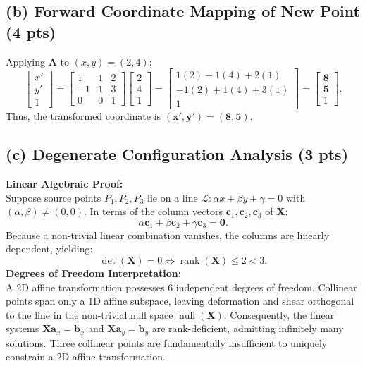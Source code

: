 \documentclass[11pt,a4paper]{article}
\begin{document}
\subsection{(b) Forward Coordinate Mapping of New Point (4 pts)}
Applying $\mathbf{A}$ to $(x, y) = (2, 4)$:
\begin{equation}
\begin{bmatrix} x' \\ y' \\ 1 \end{bmatrix} = \begin{bmatrix} 1 & 1 & 2 \\ -1 & 1 & 3 \\ 0 & 0 & 1 \end{bmatrix} \begin{bmatrix} 2 \\ 4 \\ 1 \end{bmatrix} = \begin{bmatrix} 1(2) + 1(4) + 2(1) \\ -1(2) + 1(4) + 3(1) \\ 1 \end{bmatrix} = \begin{bmatrix} \mathbf{8} \\ \mathbf{5} \\ 1 \end{bmatrix}.
\end{equation}
Thus, the transformed coordinate is $\mathbf{(x', y') = (8, 5)}$.

\subsection{(c) Degenerate Configuration Analysis (3 pts)}
\noindent\textbf{Linear Algebraic Proof:}\\
Suppose source points $P_1, P_2, P_3$ lie on a line $\mathcal{L}: \alpha x + \beta y + \gamma = 0$ with $(\alpha, \beta) \neq (0, 0)$. In terms of the column vectors $\mathbf{c}_1, \mathbf{c}_2, \mathbf{c}_3$ of $\mathbf{X}$:
\begin{equation}
\alpha \mathbf{c}_1 + \beta \mathbf{c}_2 + \gamma \mathbf{c}_3 = \mathbf{0}.
\end{equation}
Because a non-trivial linear combination vanishes, the columns are linearly dependent, yielding:
\begin{equation}
\det(\mathbf{X}) = 0 \iff \operatorname{rank}(\mathbf{X}) \le 2 < 3.
\end{equation}
\noindent\textbf{Degrees of Freedom Interpretation:}\\
A 2D affine transformation possesses 6 independent degrees of freedom. Collinear points span only a 1D affine subspace, leaving deformation and shear orthogonal to the line in the non-trivial null space $\operatorname{null}(\mathbf{X})$. Consequently, the linear systems $\mathbf{X}\mathbf{a}_x = \mathbf{b}_x$ and $\mathbf{X}\mathbf{a}_y = \mathbf{b}_y$ are rank-deficient, admitting infinitely many solutions. Three collinear points are fundamentally insufficient to uniquely constrain a 2D affine transformation.
\end{document}

